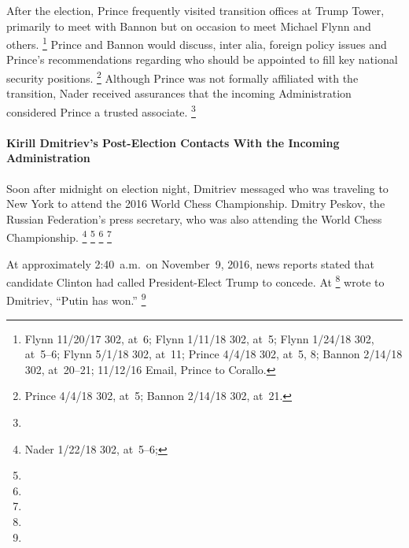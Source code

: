 After the election, Prince frequently visited transition offices at Trump Tower, primarily to meet with Bannon but on occasion to meet Michael Flynn and others.%
\footnote{Flynn 11/20/17 302, at~6;
Flynn 1/11/18 302, at~5;
Flynn 1/24/18 302, at~5--6;
Flynn 5/1/18 302, at~11;
Prince 4/4/18 302, at~5, 8;
Bannon 2/14/18 302, at~20--21;
11/12/16 Email, Prince to Corallo.}
Prince and Bannon would discuss, inter alia, foreign policy issues and Prince's recommendations regarding who should be appointed to fill key national security positions.%
\footnote{Prince 4/4/18 302, at~5;
Bannon 2/14/18 302, at~21.}
Although Prince was not formally affiliated with the transition, Nader
received assurances
that the incoming Administration considered Prince a trusted associate.%
\footnote{}

\paragraph{Kirill Dmitriev's Post-Election Contacts With the Incoming Administration}

Soon after midnight on election night, Dmitriev messaged
who was traveling to New York to attend the 2016 World Chess Championship.
Dmitry Peskov, the Russian Federation's press secretary, who was also attending the World Chess Championship.%
\footnote{ Nader 1/22/18 302, at~5--6; }
\footnote{}
\footnote{}
\footnote{}

At approximately 2:40~a.m.\ on November~9, 2016, news reports stated that candidate Clinton had called President-Elect Trump to concede.
At
\footnote{}
wrote to Dmitriev, ``Putin has won.''%
\footnote{}

